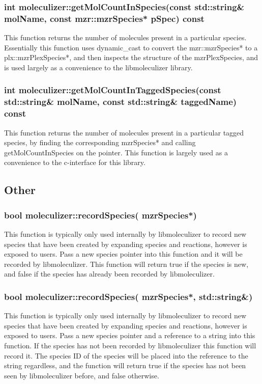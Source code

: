 \subsubsection{int moleculizer::getMolCountInSpecies(const std::string\& molName,
  const mzr::mzrSpecies* pSpec) const}
This function returns the number of molecules present in a particular
species.  Essentially this function uses dynamic\_cast to convert the
mzr::mzrSpecies* to a plx::mzrPlexSpecies*, and then inspects the
structure of the mzrPlexSpecies, and is used largely as a convenience
to the libmoleculizer library.  

\subsubsection{int moleculizer::getMolCountInTaggedSpecies(const std::string\&
  molName, const std::string\& taggedName) const}
This function returns the number of molecules present in a particular
tagged species, by finding the corresponding mzrSpecies* and calling
getMolCountInSpecies on the pointer.  This function is largely used as
a convenience to the c-interface for this library.  

\subsection{Other}

\subsubsection{bool moleculizer::recordSpecies( mzrSpecies*)}
This function is typically only used internally by libmoleculizer to
record new species that have been created by expanding species and
reactions, however is exposed to users.  Pass a new species pointer
into this function and it will be recorded by libmoleculizer.  This
function will return true if the species is new, and false if the
species has already been recorded by libmoleculizer.


\subsubsection{bool moleculizer::recordSpecies( mzrSpecies*, std::string\&)}
This function is typically only used internally by libmoleculizer to
record new species that have been created by expanding species and
reactions, however is exposed to users.  Pass a new species pointer
and a reference to a string into this function.  If the species
has not been recorded by libmoleculizer this function will record it.
The species ID of the species will be placed into the reference to the
string regardless, and the function will return true if the species
has not been seen by libmoleculizer before, and false otherwise.


